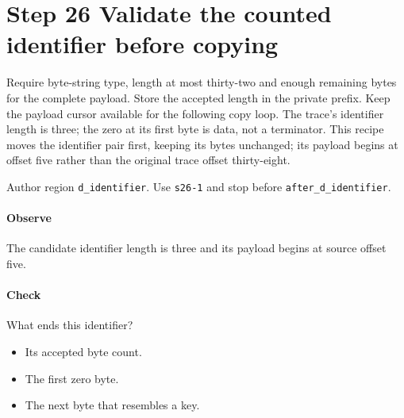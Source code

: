 \section{Step 26 Validate the counted identifier before copying}\label{cbor-s26}
Require byte-string type, length at most thirty-two and enough remaining bytes for the complete payload. Store the accepted length in the private prefix. Keep the payload cursor available for the following copy loop. The trace's identifier length is three; the zero at its first byte is data, not a terminator. This recipe moves the identifier pair first, keeping its bytes unchanged; its payload begins at offset five rather than the original trace offset thirty-eight.

Author region \texttt{d\_identifier}. Use \texttt{s26-1} and stop before \texttt{after\_d\_identifier}.

\paragraph{Observe} The candidate identifier length is three and its payload begins at source offset five.

\paragraph{Check} What ends this identifier?
\begin{itemize}
  \item[A.] Its accepted byte count.
  \item[B.] The first zero byte.
  \item[C.] The next byte that resembles a key.
\end{itemize}
